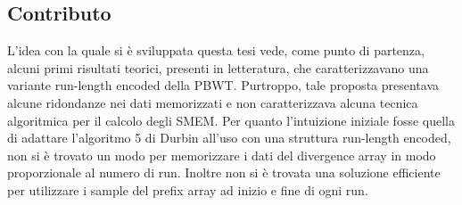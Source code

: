 \documentclass[a4paper,11pt, oneside,italian]{article}
\begin{document}
\subsection*{Contributo}
L'idea con la quale si è sviluppata questa tesi vede, come punto di partenza,
alcuni primi risultati teorici, presenti in letteratura, che caratterizzavano
una variante run-length encoded della PBWT. Purtroppo, tale proposta presentava
alcune ridondanze nei dati memorizzati e non caratterizzava alcuna tecnica
algoritmica per il calcolo degli SMEM.
Per quanto l'intuizione iniziale fosse quella di adattare l'algoritmo 5 di
Durbin all'uso con una struttura run-length encoded, non si è trovato un modo
per memorizzare i dati del divergence array in modo proporzionale al numero di
run. Inoltre non si è trovata una soluzione efficiente per utilizzare i sample
del prefix array ad inizio e fine di ogni run.
\end{document}
